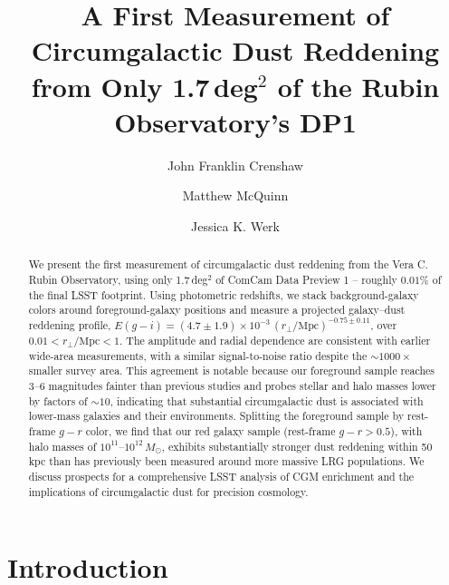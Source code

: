 \documentclass[linenumbers, twocolumn]{aastex701}
\begin{document}
\title{
    A First Measurement of Circumgalactic Dust Reddening\\
    from Only 1.7\,deg$^2$ of the Rubin Observatory's DP1
}

\author[0000-0002-2495-3514]{John Franklin Crenshaw}

\author[0000-0001-7961-9735]{Matthew McQuinn}

\author[0000-0002-0355-0134]{Jessica K. Werk}

\begin{abstract}

We present the first measurement of circumgalactic dust reddening from the Vera C. Rubin Observatory, using only 1.7\,deg$^2$ of ComCam Data Preview 1 -- roughly $0.01\%$ of the final LSST footprint.
Using photometric redshifts, we stack background-galaxy colors around foreground-galaxy positions and measure a projected galaxy--dust reddening profile, $E(g-i)=(4.7\pm1.9)\times10^{-3}\, (r_\perp/\mathrm{Mpc})^{-0.75\pm0.11}$, over $0.01<r_\perp/\mathrm{Mpc}<1$.
The amplitude and radial dependence are consistent with earlier wide-area measurements, with a similar signal-to-noise ratio despite the $\sim1000\times$ smaller survey area.
This agreement is notable because our foreground sample reaches 3--6 magnitudes fainter than previous studies and probes stellar and halo masses lower by factors of $\sim10$, indicating that substantial circumgalactic dust is associated with lower-mass galaxies and their environments.
Splitting the foreground sample by rest-frame $g-r$ color, we find that our red galaxy sample (rest-frame $g-r > 0.5$), with halo masses of $10^{11}$--$10^{12}\,M_\odot$, exhibits substantially stronger dust reddening within 50\,kpc than has previously been measured around more massive LRG populations.
We discuss prospects for a comprehensive LSST analysis of CGM enrichment and the implications of circumgalactic dust for precision cosmology.

\end{abstract}

\section{Introduction}
\label{sec:intro}
\end{document}
